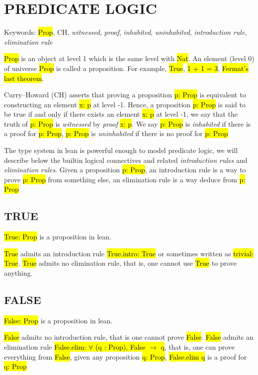 \chapter{PREDICATE LOGIC}

Keywords: \hl{Prop}, CH, \textit{witnessed}, \textit{proof}, \textit{inhabited}, \textit{uninhabited}, \textit{introduction rule}, \textit{elimination rule}

\hl{Prop} is an object at level 1 which is the same level with \hl{Nat}. An element (level 0) of universe \hl{Prop} is called a proposition. For example, \hl{True}, \hl{1 + 1 = 3}, \hl{Fermat's last theorem}.

Curry–Howard (CH) \cite{CH} asserts that proving a proposition \hl{p: Prop} is equivalent to constructing an element \hl{x: p} at level -1. Hence, a proposition \hl{p: Prop} is said to be true if and only if there exists an element  \hl{x: p} at level -1, we say that the truth of \hl{p: Prop} is \textit{witnessed} by \textit{proof} \hl{x: p}. We say \hl{p: Prop} is \textit{inhabited} if there is a proof for \hl{p: Prop}, \hl{p: Prop} is \textit{uninhabited} if there is no proof for \hl{p: Prop}

The type system in lean is powerful enough to model predicate logic, we will describe below the builtin logical connectives and related \textit{introduction rules} and \textit{elimination rules}. Given a proposition \hl{p: Prop}, an introduction rule is a way to prove \hl{p: Prop} from something else, an elimination rule is a way deduce from \hl{p: Prop}

\section{TRUE}

\hl{True: Prop} is a proposition in lean.

\hl{True} admits an introduction rule \hl{True.intro: True} or sometimes written as \hl{trivial: True}. \hl{True} admits no elimination rule, that is, one cannot use \hl{True} to prove anything.

\section{FALSE}

\hl{False: Prop} is a proposition in lean.

\hl{False} admits no introduction rule, that is one cannot prove \hl{False}. \hl{False} admits an elimination rule \hl{False.elim: $\forall$ (q : Prop), False $\to$ q}, that is, one can prove everything from \hl{False}, given any proposition \hl{q: Prop}, \hl{False.elim q} is a proof for \hl{q: Prop}

